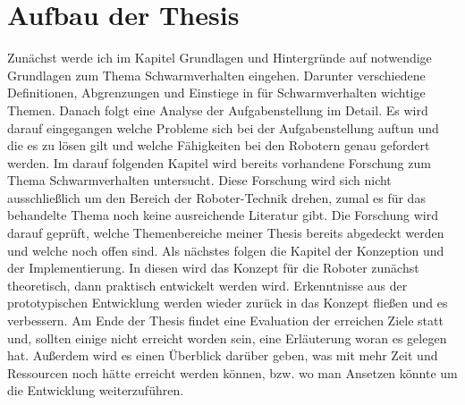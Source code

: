 \section{Aufbau der Thesis}
Zunächst werde ich im Kapitel Grundlagen und Hintergründe auf notwendige Grundlagen zum Thema Schwarmverhalten eingehen. Darunter verschiedene Definitionen, Abgrenzungen und Einstiege in für Schwarmverhalten wichtige Themen.
Danach folgt eine Analyse der Aufgabenstellung im Detail. Es wird darauf eingegangen welche Probleme sich bei der Aufgabenstellung auftun und die es zu lösen gilt und welche Fähigkeiten bei den Robotern genau gefordert werden.
Im darauf folgenden Kapitel wird bereits vorhandene Forschung zum Thema Schwarmverhalten untersucht. Diese Forschung wird sich nicht ausschließlich um den Bereich der Roboter-Technik drehen, zumal es für das behandelte Thema noch keine ausreichende Literatur gibt. Die Forschung wird darauf geprüft, welche Themenbereiche meiner Thesis bereits abgedeckt werden und welche noch offen sind.
Als nächstes folgen die Kapitel der Konzeption und der Implementierung. In diesen wird das Konzept für die Roboter zunächst theoretisch, dann praktisch entwickelt werden wird. Erkenntnisse aus der prototypischen Entwicklung werden wieder zurück in das Konzept fließen und es verbessern.
Am Ende der Thesis findet eine Evaluation der erreichen Ziele statt und, sollten einige nicht erreicht worden sein, eine Erläuterung woran es gelegen hat. Außerdem wird es einen Überblick darüber geben, was mit mehr Zeit und Ressourcen noch hätte erreicht werden können, bzw. wo man Ansetzen könnte um die Entwicklung weiterzuführen.